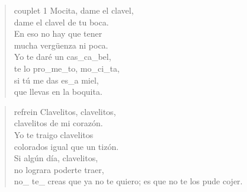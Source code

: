 
\begin{verse}{couplet 1}
Mocita, dame el clavel,\\
dame el clavel de tu boca.\\
En eso no hay que tener\\
mucha vergüenza ni poca. \hspace{1em} \hspace{1em} \hspace{1em}\\
Yo te daré un cas\_ca\_bel,\\
\hspace{1em} te lo pro\_me\_to, mo\_ci\_ta, \hspace{1em} \hspace{1em} \hspace{1em}\\
si t\'u me das es\_a miel,\\
que llevas en la boquita.
\end{verse}


\begin{verse}{refrein}
Clavelitos, clavelitos,\\
clavelitos de mi corazón.\\
Yo te traigo clavelitos\\
colorados igual que un tizón.\\
Si algún día, clavelitos,\\
no lograra poderte traer,\\
no\_ te\_ creas que ya no te quiero;
es que no te los pude cojer. \hspace{1em} \hspace{1em}
\end{verse}

